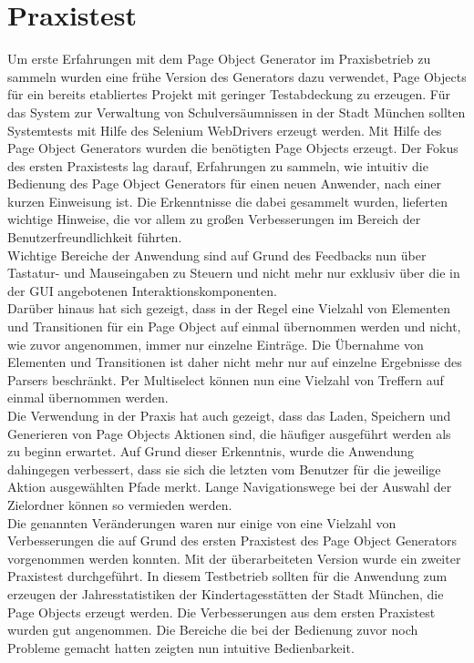 \section{Praxistest}
Um erste Erfahrungen mit dem Page Object Generator im Praxisbetrieb zu sammeln wurden eine frühe Version des Generators dazu verwendet, Page Objects für ein bereits etabliertes Projekt mit geringer Testabdeckung zu erzeugen.
Für das System zur Verwaltung von Schulversäumnissen in der Stadt München sollten Systemtests mit Hilfe des Selenium WebDrivers erzeugt werden. Mit Hilfe des Page Object Generators wurden die benötigten Page Objects erzeugt.
Der Fokus des ersten Praxistests lag darauf, Erfahrungen zu sammeln, wie intuitiv die Bedienung des Page Object Generators für einen neuen Anwender, nach einer kurzen Einweisung ist.
Die Erkenntnisse die dabei gesammelt wurden, lieferten wichtige Hinweise, die vor allem zu großen Verbesserungen im Bereich der Benutzerfreundlichkeit führten.\\
Wichtige Bereiche der Anwendung sind auf Grund des Feedbacks nun über Tastatur- und Mauseingaben zu Steuern und nicht mehr nur exklusiv über die in der GUI angebotenen Interaktionskomponenten. \\ 
Darüber hinaus hat sich gezeigt, dass in der Regel eine Vielzahl von Elementen und Transitionen für ein Page Object auf einmal übernommen werden und nicht, wie zuvor angenommen, immer nur einzelne Einträge. Die Übernahme von Elementen und Transitionen ist daher nicht mehr nur auf einzelne Ergebnisse des Parsers beschränkt. Per Multiselect können nun eine Vielzahl von Treffern auf einmal übernommen werden.\\
Die Verwendung in der Praxis hat auch gezeigt, dass das Laden, Speichern und Generieren von Page Objects Aktionen sind, die häufiger ausgeführt werden als zu beginn erwartet. Auf Grund dieser Erkenntnis, wurde die Anwendung dahingegen verbessert, dass sie sich die letzten vom Benutzer für die jeweilige Aktion ausgewählten Pfade merkt. Lange Navigationswege bei der Auswahl der Zielordner können so vermieden werden.\\
Die genannten Veränderungen waren nur einige von eine Vielzahl von Verbesserungen die auf Grund des ersten Praxistest des Page Object Generators vorgenommen werden konnten.
Mit der überarbeiteten Version wurde ein zweiter Praxistest durchgeführt. In diesem Testbetrieb sollten für die Anwendung zum erzeugen der Jahresstatistiken der Kindertagesstätten der Stadt München, die Page Objects erzeugt werden.
Die Verbesserungen aus dem ersten Praxistest wurden gut angenommen. Die Bereiche die bei der Bedienung zuvor noch Probleme gemacht hatten zeigten nun intuitive Bedienbarkeit.
